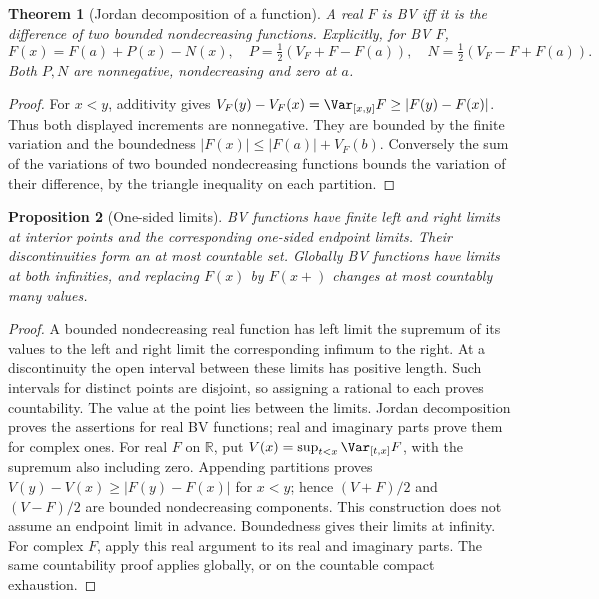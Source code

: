 \documentclass[11pt,oneside,openany]{book}
\newtheorem{theorem}{Theorem}[chapter]
\newtheorem{proposition}[theorem]{Proposition}
\theoremstyle{definition}
\theoremstyle{remark}
\newcommand{\R}{\mathbb R}\newcommand{\C}{\mathbb C}
\newcommand{\family}[1]{}
\begin{document}
\begin{theorem}[Jordan decomposition of a function]\family{D11.12.jordan_functions}\label{d11:12:jordan-functions}
A real $F$ is BV iff it is the difference of two bounded nondecreasing
functions. Explicitly, for BV $F$,
\[
 F(x)=F(a)+P(x)-N(x),\quad
 P=\tfrac12(V_F+F-F(a)),\quad N=\tfrac12(V_F-F+F(a)).
\]
Both $P,N$ are nonnegative, nondecreasing and zero at $a$.
\end{theorem}
\begin{proof}
For $x<y$, additivity gives
$V_F(y)-V_F(x)=\Var_{[x,y]}F\geq|F(y)-F(x)|$.
Thus both displayed increments are nonnegative. They are bounded by the
finite variation and the boundedness $|F(x)|\leq|F(a)|+V_F(b)$.
Conversely the sum of the variations of two bounded nondecreasing
functions bounds the variation of their difference, by the triangle
inequality on each partition.
\end{proof}

\begin{proposition}[One-sided limits]\family{D11.12.bv_one_sided}\label{d11:12:bv-one-sided}
BV functions have finite left and right limits at interior points and the
corresponding one-sided endpoint limits. Their discontinuities form an
at most countable set. Globally BV functions have limits at both infinities,
and replacing $F(x)$ by $F(x+)$ changes at most countably many values.
\end{proposition}
\begin{proof}
A bounded nondecreasing real function has left limit the supremum of its
values to the left and right limit the corresponding infimum to the
right. At a discontinuity the open interval between these limits has
positive length. Such intervals for distinct points are disjoint, so
assigning a rational to each proves countability. The value at the point
lies between the limits. Jordan decomposition proves the assertions for
real BV functions; real and imaginary parts prove them for complex ones.
For real $F$ on $\R$, put $V(x)=\sup_{t<x}\Var_{[t,x]}F$, with the supremum also
including zero. Appending partitions proves
$V(y)-V(x)\geq|F(y)-F(x)|$ for $x<y$; hence $(V+F)/2$ and $(V-F)/2$
are bounded nondecreasing components. This construction does not assume
an endpoint limit in advance. Boundedness gives their limits at infinity.
For complex $F$, apply this real argument to its real and imaginary parts. The same
countability proof applies globally, or on the countable compact exhaustion.
\end{proof}
\end{document}
